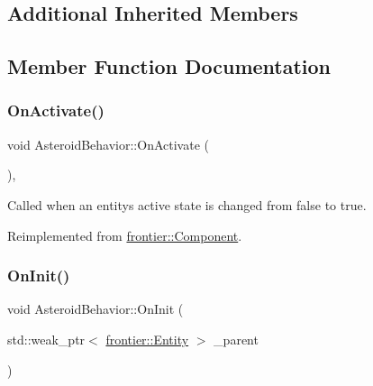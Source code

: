 \subsection*{Additional Inherited Members}


\subsection{Member Function Documentation}
\mbox{\label{class_asteroid_behavior_a7c4f344a9461d1296d4dcfcd51ed3bbc}} 
\subsubsection{\texorpdfstring{On\+Activate()}{OnActivate()}}
{\footnotesize\ttfamily void Asteroid\+Behavior\+::\+On\+Activate (\begin{DoxyParamCaption}{ }\end{DoxyParamCaption})\hspace{0.3cm}{\ttfamily [override]}, {\ttfamily [virtual]}}



Called when an entity\textquotesingle{}s active state is changed from false to true. 



Reimplemented from \hyperlink{classfrontier_1_1_component_a77fca7ba1960aafb9bc05905e300c79d}{frontier\+::\+Component}.

\mbox{\label{class_asteroid_behavior_a79d9559f0d8e109e928acf7f8ff7acea}} 
\subsubsection{\texorpdfstring{On\+Init()}{OnInit()}}
{\footnotesize\ttfamily void Asteroid\+Behavior\+::\+On\+Init (\begin{DoxyParamCaption}\item[{std\+::weak\+\_\+ptr$<$ \hyperlink{classfrontier_1_1_entity}{frontier\+::\+Entity} $>$}]{\+\_\+parent }\end{DoxyParamCaption})\hspace{0.3cm}{\ttfamily [virtual]}}



